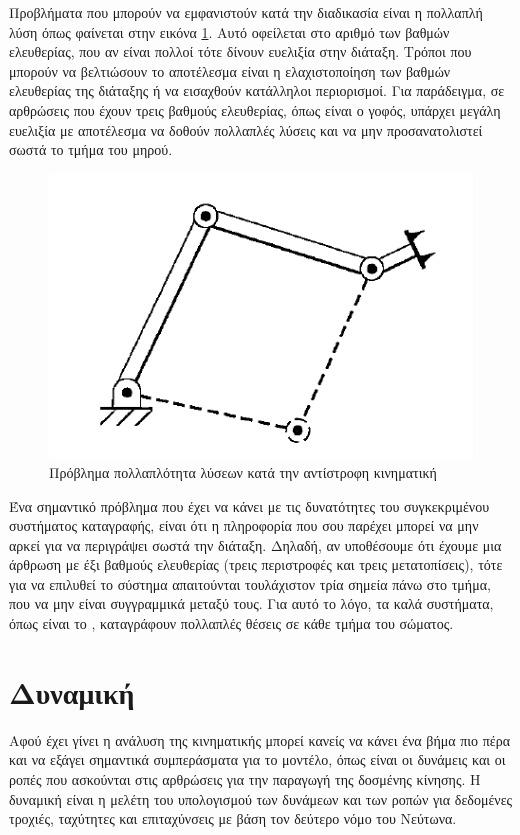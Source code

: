 Προβλήματα που μπορούν να εμφανιστούν κατά την διαδικασία είναι η πολλαπλή λύση όπως φαίνεται στην εικόνα \ref{fig:ik-multiple-solutions}. Αυτό οφείλεται στο αριθμό των βαθμών ελευθερίας, που αν είναι πολλοί τότε δίνουν ευελιξία στην διάταξη. Τρόποι που μπορούν να βελτιώσουν το αποτέλεσμα είναι η ελαχιστοποίηση των βαθμών ελευθερίας της διάταξης ή να εισαχθούν κατάλληλοι περιορισμοί. Για παράδειγμα, σε αρθρώσεις που έχουν τρεις βαθμούς ελευθερίας, όπως είναι ο γοφός, υπάρχει μεγάλη ευελιξία με αποτέλεσμα να δοθούν πολλαπλές λύσεις και να μην προσανατολιστεί σωστά το τμήμα του μηρού.

\begin{figure}[H]
    \centering
    \includegraphics[width=.7\textwidth, height=.29\textheight]{rigidbody/fig/ik-multiple-solutions.png}
    \caption{Πρόβλημα πολλαπλότητα λύσεων κατά την αντίστροφη κινηματική\cite{craig95}}
    \label{fig:ik-multiple-solutions}
\end{figure}

Ένα σημαντικό πρόβλημα που έχει να κάνει με τις δυνατότητες του συγκεκριμένου συστήματος καταγραφής, είναι ότι η πληροφορία που σου παρέχει μπορεί να μην αρκεί για να περιγράψει σωστά την διάταξη. Δηλαδή, αν υποθέσουμε ότι έχουμε μια άρθρωση με έξι βαθμούς ελευθερίας (τρεις περιστροφές και τρεις μετατοπίσεις), τότε για να επιλυθεί το σύστημα απαιτούνται τουλάχιστον τρία σημεία πάνω στο τμήμα, που να μην είναι συγγραμμικά μεταξύ τους. Για αυτό το λόγο, τα καλά συστήματα, όπως είναι το , καταγράφουν πολλαπλές θέσεις σε κάθε τμήμα του σώματος.

\section{Δυναμική}

Αφού έχει γίνει η ανάλυση της κινηματικής μπορεί κανείς να κάνει ένα βήμα πιο πέρα και να εξάγει σημαντικά συμπεράσματα για το μοντέλο, όπως είναι οι δυνάμεις και οι ροπές που ασκούνται στις αρθρώσεις για την παραγωγή της δοσμένης κίνησης. Η δυναμική είναι η μελέτη του υπολογισμού των δυνάμεων και των ροπών για δεδομένες τροχιές, ταχύτητες και επιταχύνσεις με βάση τον δεύτερο νόμο του Νεύτωνα.

